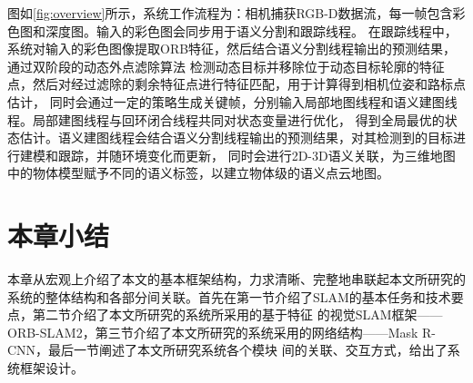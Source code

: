 图如\ref{fig:overview}所示，系统工作流程为：相机捕获RGB-D数据流，每一帧包含彩色图和深度图。输入的彩色图会同步用于语义分割和跟踪线程。
在跟踪线程中，系统对输入的彩色图像提取ORB特征，然后结合语义分割线程输出的预测结果，通过双阶段的动态外点滤除算法
检测动态目标并移除位于动态目标轮廓的特征点，然后对经过滤除的剩余特征点进行特征匹配，用于计算得到相机位姿和路标点估计，
同时会通过一定的策略生成关键帧，分别输入局部地图线程和语义建图线程。局部建图线程与回环闭合线程共同对状态变量进行优化，
得到全局最优的状态估计。语义建图线程会结合语义分割线程输出的预测结果，对其检测到的目标进行建模和跟踪，并随环境变化而更新，
同时会进行2D-3D语义关联，为三维地图中的物体模型赋予不同的语义标签，以建立物体级的语义点云地图。

\section{本章小结}
本章从宏观上介绍了本文的基本框架结构，力求清晰、完整地串联起本文所研究的系统的整体结构和各部分间关联。首先在第一节介绍了SLAM的基本任务和技术要点，第二节介绍了本文所研究的系统所采用的基于特征
的视觉SLAM框架——ORB-SLAM2，第三节介绍了本文所研究的系统采用的网络结构——Mask R-CNN，最后一节阐述了本文所研究系统各个模块
间的关联、交互方式，给出了系统框架设计。
